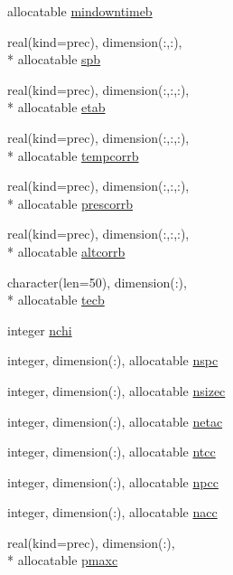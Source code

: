 \begin{DoxyCompactItemize}
allocatable \hyperlink{classinputvar_ae93da8603e9899963da53596705b1d98}{mindowntimeb}
\item 
real(kind=prec), dimension(\-:,\-:), \\*
allocatable \hyperlink{classinputvar_acd5ae0efcfc5e54e9c73d085132bcf5a}{spb}
\item 
real(kind=prec), dimension(\-:,\-:,\-:), \\*
allocatable \hyperlink{classinputvar_adba062c6d3ce600124e2cd8943f7c6e6}{etab}
\item 
real(kind=prec), dimension(\-:,\-:,\-:), \\*
allocatable \hyperlink{classinputvar_a4270f23d875d4a85d7bd5d6699205d03}{tempcorrb}
\item 
real(kind=prec), dimension(\-:,\-:,\-:), \\*
allocatable \hyperlink{classinputvar_a4de979203fa5e65fe0cbfd77c60654ae}{prescorrb}
\item 
real(kind=prec), dimension(\-:,\-:,\-:), \\*
allocatable \hyperlink{classinputvar_a3fb49f59a3c5a2a19350be6bea0d69c2}{altcorrb}
\item 
character(len=50), dimension(\-:), \\*
allocatable \hyperlink{classinputvar_ab2486a625a1ff1aaf70cb9e38d8c07db}{tecb}
\item 
integer \hyperlink{classinputvar_ac34eff504af528e971c7174dfcb39028}{nchi}
\item 
integer, dimension(\-:), allocatable \hyperlink{classinputvar_aad6ce13b0378ba79e193cb3738e2d938}{nspc}
\item 
integer, dimension(\-:), allocatable \hyperlink{classinputvar_af28da5ec88564638bee476f2a37f5308}{nsizec}
\item 
integer, dimension(\-:), allocatable \hyperlink{classinputvar_ad9998f4f97f100bf6294fb8fa083bfe7}{netac}
\item 
integer, dimension(\-:), allocatable \hyperlink{classinputvar_aaf3cc67ce289abacf61f20f5fdcfc3f6}{ntcc}
\item 
integer, dimension(\-:), allocatable \hyperlink{classinputvar_a78f4d80d45d564c96dd9101258656f66}{npcc}
\item 
integer, dimension(\-:), allocatable \hyperlink{classinputvar_a8e4bb497a3825e6f554e3268dd2bbd63}{nacc}
\item 
real(kind=prec), dimension(\-:), \\*
allocatable \hyperlink{classinputvar_a93b555571bee30038d48c86de7ab5c14}{pmaxc}
\item 

\end{DoxyCompactItemize}
